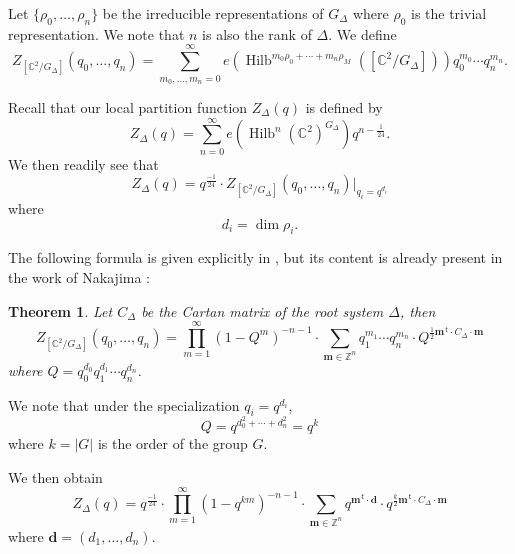 \documentclass{article}
\newtheorem{theorem}{Theorem}[section]
\theoremstyle{definition}
\newcommand{\half}{\frac{1}{2}}
\newcommand{\CC} {{\mathbb C}}          %
\newcommand{\ZZ} {{\mathbb Z}}		%
\renewcommand{\top}{\,\mathsf{t}}
\newcommand{\mvec}{\bm{m}}
\newcommand{\dvec}{\bm{d }}
\newcommand{\Hilb}{\operatorname{Hilb}}
\begin{document}
Let $\{\rho_{0},\dotsc ,\rho_{n} \}$ be the irreducible
representations of $G_{\Delta}$ where $\rho_{0}$ is the trivial
representation. We note that $n$ is also the rank of $\Delta$. We
define
\[
Z_{[\CC^{2}/G_{\Delta}]} (q_{0},\dotsc ,q_{n}) = \sum_{m_{0},\dotsc
,m_{n}=0}^{\infty} e\left(\Hilb^{m_{0}\rho_{0}+\dotsb
+m_{n}\rho_{M}}([\CC^{2}/G_{\Delta}]) \right) q_{0}^{m_{0}}\dotsb
q_{n}^{m_{n}} .
\]

Recall that our local partition function $Z_{\Delta}(q)$ is defined by
\[
Z_{\Delta}(q) = \sum_{n=0}^{\infty}
e\left(\Hilb^{n}(\CC^{2})^{G_{\Delta}} \right) q^{n-\frac{1}{24}}. 
\]
We then readily see that
\[
Z_{\Delta}(q) = q^{\frac{-1}{24}}\cdot  Z_{[\CC^{2}/G_{\Delta}]}
(q_{0},\dotsc ,q_{n})|_{q_{i}=q^{d_{i}}}
\]
where
\[
d_{i} =\dim \rho_{i}.
\]

The following formula is given explicitly in \cite[Thm~1.3]{gyenge2015euler}, but its content is already present in the work of Nakajima \cite{nakajima2002geometric}:
\begin{theorem} \label{thm: Zorbifold formula}
Let $C_{\Delta}$ be the Cartan matrix of the root system $\Delta$,
then 
\[
Z_{[\CC^{2}/G_{\Delta}]} (q_{0},\dotsc ,q_{n}) = \prod_{m=1}^{\infty}
(1-Q^{m})^{-n-1} \cdot \sum_{\mvec \in \ZZ^{n}} q_{1}^{m_{1}}\dotsb
q_{n}^{m_{n}} \cdot Q^{\half \mvec^{\top}\cdot C_{\Delta}\cdot \mvec}
\]
where $Q=q_{0}^{d_{0}}q_{1}^{d_{1}}\dotsb q_{n}^{d_{n}}$.
\end{theorem}
We note that under the specialization $q_{i}=q^{d_{i}}$, 
\[
Q=q^{d_{0}^{2}+\dotsb +d_{n}^{2}} = q^{k}
\]
where $k=|G|$ is the order of the group $G$.

We then obtain
\[
Z_{\Delta}(q) = q^{\frac{-1}{24}}\cdot
\prod_{m=1}^{\infty}(1-q^{km})^{-n-1} \cdot \sum_{\mvec \in \ZZ^{n}}
q^{\mvec^{\top}\cdot \dvec} \cdot q^{\frac{k}{2}\mvec^{\top}\cdot C_{\Delta}\cdot \mvec}
\]
where $\dvec =(d_{1},\dotsc ,d_{n})$.
\end{document}

